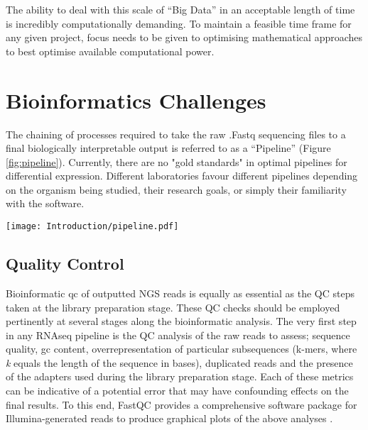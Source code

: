 The ability to deal with this scale of “Big Data” in an acceptable length of time is incredibly computationally demanding. To maintain a feasible time frame for any given project, focus needs to be given to optimising mathematical approaches to best optimise available computational power. 

\section{Bioinformatics Challenges}

The chaining of processes required to take the raw .Fastq sequencing files to a final biologically interpretable output is referred to as a “Pipeline” (Figure \ref{fig:pipeline}). Currently, there are no "gold standards" in optimal pipelines for differential expression. Different laboratories favour different pipelines depending on the organism being studied, their research goals, or simply their familiarity with the software.


\begin{figure*}[!htbp]
\centering
\texttt{[image: Introduction/pipeline.pdf]}
\caption[Example Pipeline for RNAseq Experiment]{Example Pipeline for RNAseq Experiment. Here, each step is shown from raw demultiplexed reads to final biologically interpretable output files. Some examples of software programs are shown for each step. Also displayed are the common file types associated with each stage in the pipeline.}
\label{fig:pipeline}
\end{figure*}

\subsection{Quality Control}

Bioinformatic \acrfull{qc} of outputted NGS reads is equally as essential as the QC steps taken at the library preparation stage. These QC checks should be employed pertinently at several stages along the bioinformatic analysis. The very first step in any RNAseq pipeline is the QC analysis of the raw reads to assess; sequence quality, \acrfull{gc} content, overrepresentation of particular subsequences (k-mers, where \textit{k} equals the length of the sequence in bases), duplicated reads and the presence of the adapters used during the library preparation stage. Each of these metrics can be indicative of a potential error that may have confounding effects on the final results. To this end, FastQC provides a comprehensive software package for Illumina-generated reads to produce graphical plots of the above analyses \cite{Andrews2010}. 


